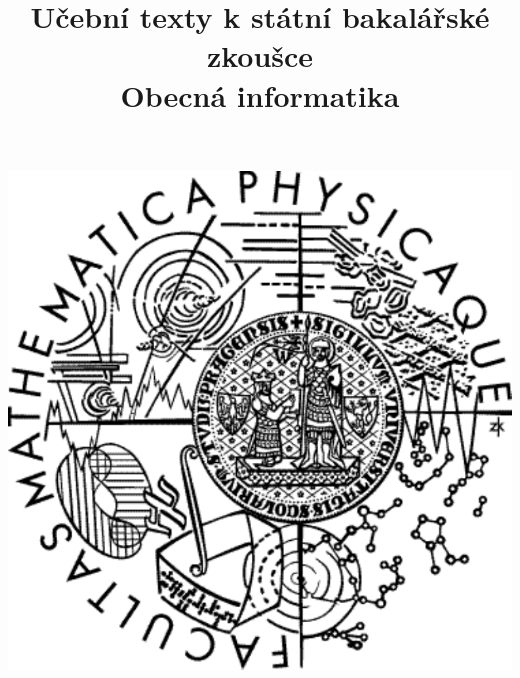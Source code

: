 \clearpage

\clearpage

\title{\LARGE Učební texty k státní bakalářské zkoušce \\ Obecná informatika}




\maketitle

\vspace{10mm}
\begin{center}
\includegraphics[scale=0.5]{../common/logo.pdf}
\end{center} 

\clearpage

\clearpage

\tableofcontents

\newpage

